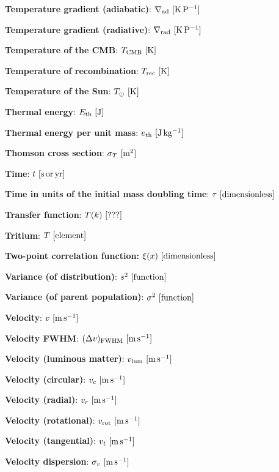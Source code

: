 \documentclass[a4paper,10pt]{article}
\begin{document}
{\noindent}\textbf{Temperature gradient (adiabatic)}: $\nabla_{\rm ad} ~ [{\rm K\,P^{-1}}]$

{\noindent}\textbf{Temperature gradient (radiative)}: $\nabla_{\rm rad} ~ [{\rm K\,P^{-1}}]$

{\noindent}\textbf{Temperature of the CMB}: $T_{\rm CMB} ~ [{\rm K}]$

{\noindent}\textbf{Temperature of recombination}: $T_{\rm rec} ~ [{\rm K}]$

{\noindent}\textbf{Temperature of the Sun}: $T_\odot ~ [{\rm K}]$

{\noindent}\textbf{Thermal energy}: $E_\mathrm{th} ~ [{\rm J}]$

{\noindent}\textbf{Thermal energy per unit mass}: $e_\mathrm{th} ~ [{\rm J\,kg^{-1}}]$

{\noindent}\textbf{Thomson cross section}: $\sigma_T ~ [{\rm m^2}]$

{\noindent}\textbf{Time}: $t ~ [{\rm s\,or\,yr}]$

{\noindent}\textbf{Time in units of the initial mass doubling time}: $\tau ~ [{\rm dimensionless}]$

{\noindent}\textbf{Transfer function}: $T(k) ~ [{\rm ???}]$

{\noindent}\textbf{Tritium}: $T ~ [{\rm element}]$

{\noindent}\textbf{Two-point correlation function:} $\xi(x) ~ [{\rm dimensionless}]$

{\noindent}\textbf{Variance (of distribution)}: $s^2 ~ [{\rm function}]$

{\noindent}\textbf{Variance (of parent population)}: $\sigma^2 ~ [{\rm function}]$

{\noindent}\textbf{Velocity}: $v ~ [{\rm m\,s^{-1}}]$

{\noindent}\textbf{Velocity FWHM}: $(\Delta v)_{\rm FWHM} ~ [{\rm m\,s^{-1}}]$

{\noindent}\textbf{Velocity (luminous matter)}: $v_{\rm lum} ~ [{\rm m\,s^{-1}}]$

{\noindent}\textbf{Velocity (circular)}: $v_c ~ [{\rm m\,s^{-1}}]$

{\noindent}\textbf{Velocity (radial)}: $v_r ~ [{\rm m\,s^{-1}}]$

{\noindent}\textbf{Velocity (rotational)}: $v_\mathrm{rot} ~ [{\rm m\,s^{-1}}]$

{\noindent}\textbf{Velocity (tangential)}: $v_t ~ [{\rm m\,s^{-1}}]$

{\noindent}\textbf{Velocity dispersion}: $\sigma_v ~ [{\rm m\,s^{-1}}]$
\end{document}
